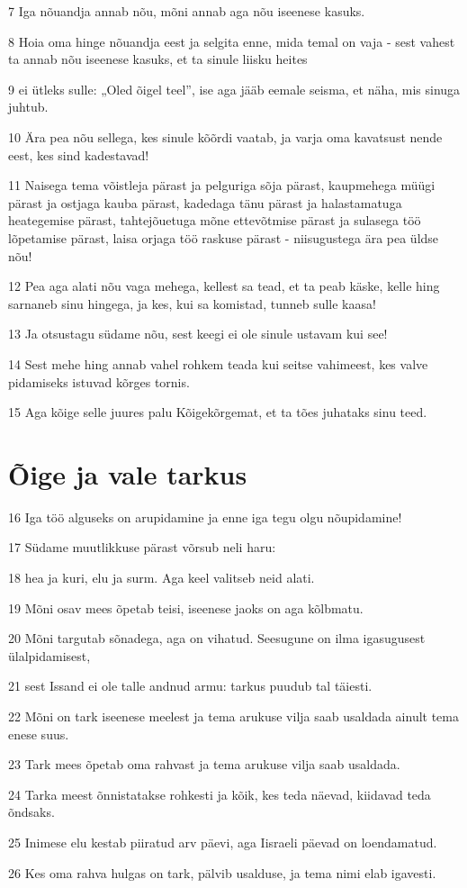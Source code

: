 \par 7 Iga nõuandja annab nõu, mõni annab aga nõu iseenese kasuks.
\par 8 Hoia oma hinge nõuandja eest ja selgita enne, mida temal on vaja - sest vahest ta annab nõu iseenese kasuks, et ta sinule liisku heites
\par 9 ei ütleks sulle: „Oled õigel teel”, ise aga jääb eemale seisma, et näha, mis sinuga juhtub.
\par 10 Ära pea nõu sellega, kes sinule kõõrdi vaatab, ja varja oma kavatsust nende eest, kes sind kadestavad!
\par 11 Naisega tema võistleja pärast ja pelguriga sõja pärast, kaupmehega müügi pärast ja ostjaga kauba pärast, kadedaga tänu pärast ja halastamatuga heategemise pärast, tahtejõuetuga mõne ettevõtmise pärast ja sulasega töö lõpetamise pärast, laisa orjaga töö raskuse pärast - niisugustega ära pea üldse nõu!
\par 12 Pea aga alati nõu vaga mehega, kellest sa tead, et ta peab käske, kelle hing sarnaneb sinu hingega, ja kes, kui sa komistad, tunneb sulle kaasa!
\par 13 Ja otsustagu südame nõu, sest keegi ei ole sinule ustavam kui see!
\par 14 Sest mehe hing annab vahel rohkem teada kui seitse vahimeest, kes valve pidamiseks istuvad kõrges tornis.
\par 15 Aga kõige selle juures palu Kõigekõrgemat, et ta tões juhataks sinu teed.

\section*{Õige ja vale tarkus}

\par 16 Iga töö alguseks on arupidamine ja enne iga tegu olgu nõupidamine!
\par 17 Südame muutlikkuse pärast võrsub neli haru:
\par 18 hea ja kuri, elu ja surm. Aga keel valitseb neid alati.
\par 19 Mõni osav mees õpetab teisi, iseenese jaoks on aga kõlbmatu.
\par 20 Mõni targutab sõnadega, aga on vihatud. Seesugune on ilma igasugusest ülalpidamisest,
\par 21 sest Issand ei ole talle andnud armu: tarkus puudub tal täiesti.
\par 22 Mõni on tark iseenese meelest ja tema arukuse vilja saab usaldada ainult tema enese suus.
\par 23 Tark mees õpetab oma rahvast ja tema arukuse vilja saab usaldada.
\par 24 Tarka meest õnnistatakse rohkesti ja kõik, kes teda näevad, kiidavad teda õndsaks.
\par 25 Inimese elu kestab piiratud arv päevi, aga Iisraeli päevad on loendamatud.
\par 26 Kes oma rahva hulgas on tark, pälvib usalduse, ja tema nimi elab igavesti.

